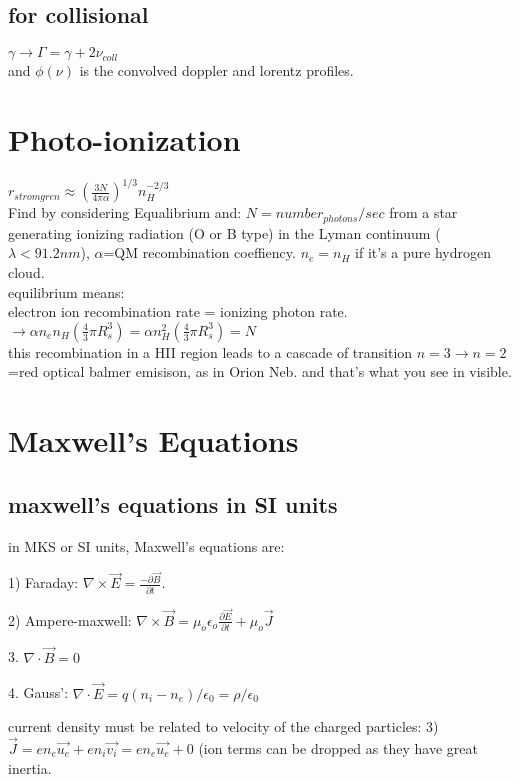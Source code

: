 \documentclass[12pt]{report}
\begin{document}
\subsection{for collisional} $\gamma\rightarrow \Gamma=\gamma+2\nu_{coll} $\\
and $ \phi(\nu) $ is the convolved doppler and lorentz  profiles.\\


\section{Photo-ionization}

 $r_{stromgren}\approx (\frac{3N}{4\pi\alpha})^{1/3}n_H^{-2/3}$\\
Find by considering Equalibrium and: $N=number_{photons}/sec$ from a star generating ionizing radiation (O or B type) in the Lyman continuum ($\lambda <91.2nm$), $\alpha$=QM recombination coeffiency. $n_e=n_H$ if it's a pure hydrogen cloud.\\ 
equilibrium means: \\electron ion recombination rate = ionizing photon rate.\\
$\rightarrow \alpha n_e n_H (\frac{4}{3}\pi R^3_s)= \alpha n_H^2(\frac{4}{3}\pi R^3_s)=N$\\
this recombination in a HII region leads to a cascade of transition $n=3\rightarrow n=2$=red optical balmer emisison, as in Orion Neb.  and that's what you see in visible.


\section{Maxwell's Equations }
\subsection{maxwell's equations in SI units}  
in MKS or SI units, Maxwell's equations are:

1) Faraday: $\nabla \times \vec{E} = \frac{-\partial \vec{B}}{\partial t}$.

2) Ampere-maxwell: $\nabla \times \vec{B} =\mu_o \epsilon_o\frac{\partial \vec{E}}{\partial t}+\mu_o \vec{J}$

3. $\nabla \cdot \vec{B}=0$

4. Gauss': $\nabla \cdot \vec{E}=q(n_i-n_e)/\epsilon_0=\rho/\epsilon_0$

current density must be related to velocity of the charged particles: 3) $\vec{J} = e n_e \vec{u_e}+e n_i \vec{v_i} =e n_e \vec{u_e}+0$ (ion terms can be dropped as they have great inertia.
\end{document}
